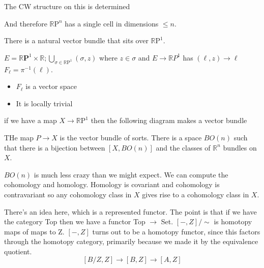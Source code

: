 \documentclass[10pt]{article}
\theoremstyle{definition}
\begin{document}
	The CW structure on this is determined 
	
	\begin{center}
	\end{center}
	And therefore $\mathbb{R}\text{P}^n$ has a single cell in dimensions $\leq n$. 
	
	There is a natural vector bundle that sits over $\mathbb{R}\text{P}^1$. 
	\begin{center}
	\end{center}
	$E=\mathbb{R}\textbf{P}^1\times \mathbb{R};  \bigcup_{\sigma\in \mathbb{R}\text{P}^1}(\sigma,z)$ where $z\in \sigma$ and $E\to \mathbb{R} P^1$ has $(\ell,z)\to \ell$
	$F_\ell=\pi^{-1}(\ell)$. \begin{itemize}
		\item $F_\ell$ is a vector space
		\item It is locally trivial 
	\end{itemize}
	if we have a map $X\to \mathbb{R} \text{P}^1$ then the following diagram makes a vector bundle
	\begin{center}
	\end{center}
	THe map $P\to X$ is the vector bundle of sorts.
	There is a space $BO(n)$ such that there is a bijection between $[X,BO(n)]$ and the classes of $\mathbb{R}^n$ bundles on $X$. 
	
	$BO(n)$ is much less crazy than we might expect. We can compute the cohomology and homology. Homology is covariant and cohomology is contravariant so any cohomology class in $X$ gives rise to a cohomology class in $X$.  
	
	There's an idea here, which is a represented functor. The point is that if we have the category \textsf{Top} then we have a functor \textsf{Top} $\to$ \textsf{Set}.  $[-,Z]/\sim$ is homotopy maps of maps to Z. $[-,Z]$ turns out to be a homotopy functor, since this factors through the homotopy category, primarily because we made it by the equivalence quotient. 
	\[
	[B/Z,Z]\to [B,Z]\to [A,Z]
	\]
	
\end{document}
